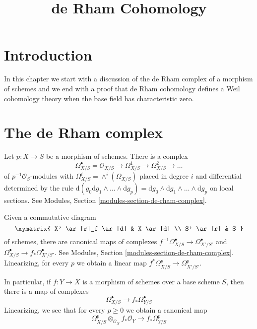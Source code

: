 

%


\title{de Rham Cohomology}


\maketitle

\label{section-phantom}

\tableofcontents

\section{Introduction}
\label{section-introduction}

\noindent
In this chapter we start with a discussion of the de Rham complex
of a morphism of schemes and we end with a proof that de Rham cohomology
defines a Weil cohomology theory when the base field has characteristic zero.




\section{The de Rham complex}
\label{section-de-rham-complex}

\noindent
Let $p : X \to S$ be a morphism of schemes. There is a complex
$$
\Omega^\bullet_{X/S} =
\mathcal{O}_{X/S} \to \Omega^1_{X/S} \to \Omega^2_{X/S} \to \ldots
$$
of $p^{-1}\mathcal{O}_S$-modules with
$\Omega^i_{X/S} = \wedge^i(\Omega_{X/S})$
placed in degree $i$ and differential determined by the rule
$\text{d}(g_0 \text{d}g_1 \wedge \ldots \wedge \text{d}g_p) =
\text{d}g_0 \wedge \text{d}g_1 \wedge \ldots \wedge \text{d}g_p$
on local sections.
See Modules, Section \ref{modules-section-de-rham-complex}.

\medskip\noindent
Given a commutative diagram
$$
\xymatrix{
X' \ar[r]_f \ar[d] & X \ar[d] \\
S' \ar[r] & S
}
$$
of schemes, there are canonical maps of complexes
$f^{-1}\Omega_{X/S}^\bullet \to \Omega^\bullet_{X'/S'}$ and
$\Omega_{X/S}^\bullet \to f_*\Omega^\bullet_{X'/S'}$.
See Modules, Section \ref{modules-section-de-rham-complex}.
Linearizing, for every $p$ we obtain a linear map
$f^*\Omega^p_{X/S} \to \Omega^p_{X'/S'}$.

\medskip\noindent
In particular, if $f : Y \to X$ is a morphism of schemes over
a base scheme $S$, then there is a map of complexes
$$
\Omega^\bullet_{X/S} \longrightarrow f_*\Omega^\bullet_{Y/S}
$$
Linearizing, we see that for every $p \geq 0$ we obtain a canonical map
$$
\Omega^p_{X/S} \otimes_{\mathcal{O}_X} f_*\mathcal{O}_Y
\longrightarrow
f_*\Omega^p_{Y/S}
$$

